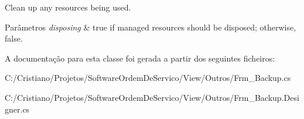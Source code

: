 Clean up any resources being used. 


\begin{DoxyParams}{Parâmetros}
{\em disposing} & true if managed resources should be disposed; otherwise, false.\\
\hline
\end{DoxyParams}


A documentação para esta classe foi gerada a partir dos seguintes ficheiros\+:\begin{DoxyCompactItemize}
\item 
C\+:/\+Cristiano/\+Projetos/\+Software\+Ordem\+De\+Servico/\+View/\+Outros/Frm\+\_\+\+Backup.\+cs\item 
C\+:/\+Cristiano/\+Projetos/\+Software\+Ordem\+De\+Servico/\+View/\+Outros/Frm\+\_\+\+Backup.\+Designer.\+cs\end{DoxyCompactItemize}
